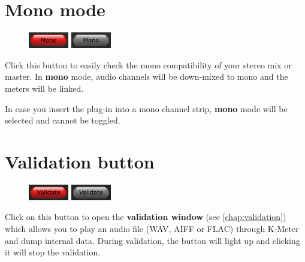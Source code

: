 \newpage %

\section{Mono mode}

\begin{figure}
  \includegraphics[scale=\screenshotscale,clip]{include/images/button_mono_on.png}
  \newline \vspace{-0.9\baselineskip}
  \includegraphics[scale=\screenshotscale,clip]{include/images/button_mono_off.png}
\end{figure}

Click this button to easily check the mono compatibility of your
stereo mix or master.  In \textbf{mono} mode, audio channels will be
down-mixed to mono and the meters will be linked.

In case you insert the plug-in into a mono channel strip,
\textbf{mono} mode will be selected and cannot be toggled.

\section{Validation button}
\label{sec:validation_button}

\begin{figure}
  \includegraphics[scale=\screenshotscale,clip]{include/images/button_validate_on.png}
  \newline \vspace{-0.9\baselineskip}
  \includegraphics[scale=\screenshotscale,clip]{include/images/button_validate_off.png}
\end{figure}

Click on this button to open the \textbf{validation window} (see
\ref{chap:validation}) which allows you to play an audio file (WAV,
AIFF or FLAC) through K-Meter and dump internal data.  During
validation, the button will light up and clicking it will stop the
validation.

